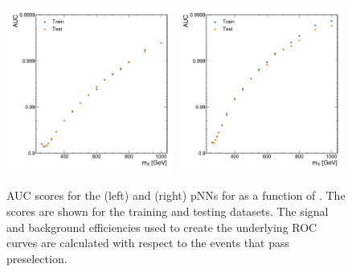 \begin{figure}
    \centering
    \includegraphics[width=0.49\textwidth]{Figures/Dihiggs/categorisation/ROC/Radion/auc.pdf}
    \includegraphics[width=0.49\textwidth]{Figures/Dihiggs/categorisation/ROC/Graviton/auc.pdf}
    \caption[AUC Scores for the \XHH pNNs]{AUC scores for the \XZeroHH (left) and \XTwoHH (right) pNNs for as a function of \mX. The scores are shown for the training and testing datasets. The signal and background efficiencies used to create the underlying ROC curves are calculated with respect to the events that pass preselection.}\label{fig:xhh_auc}
\end{figure}

